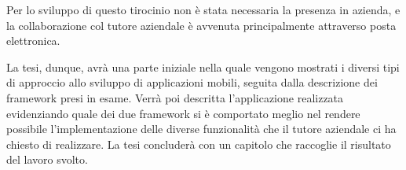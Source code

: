 	Per lo sviluppo di questo tirocinio non è stata necessaria la presenza in 
	azienda, e la collaborazione col tutore aziendale è avvenuta principalmente
	attraverso posta elettronica.
	
	La tesi, dunque, avrà una parte iniziale nella quale vengono mostrati i 
	diversi tipi di approccio allo sviluppo di applicazioni mobili, seguita dalla
	descrizione dei framework presi in esame. Verrà poi descritta l'applicazione
	realizzata evidenziando quale dei due framework si è comportato meglio nel 
	rendere possibile l'implementazione delle diverse funzionalità che il 
	tutore aziendale ci ha chiesto di realizzare. La tesi concluderà con un capitolo 
	che raccoglie il risultato del lavoro svolto.
	
